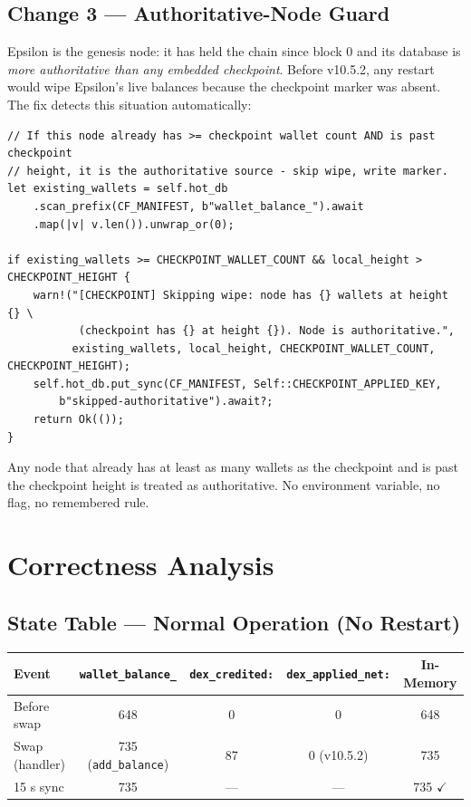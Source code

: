 \documentclass[11pt,a4paper]{article}
\begin{document}
\subsection{Change 3 — Authoritative-Node Guard}

Epsilon is the genesis node: it has held the chain since block 0 and its
database is \emph{more authoritative than any embedded checkpoint}.  Before
v10.5.2, any restart would wipe Epsilon's live balances because the checkpoint
marker was absent.  The fix detects this situation automatically:

\begin{lstlisting}[caption={Authoritative-node guard — \texttt{lib.rs} checkpoint entry point},
                   label={lst:guard}]
// If this node already has >= checkpoint wallet count AND is past checkpoint
// height, it is the authoritative source - skip wipe, write marker.
let existing_wallets = self.hot_db
    .scan_prefix(CF_MANIFEST, b"wallet_balance_").await
    .map(|v| v.len()).unwrap_or(0);

if existing_wallets >= CHECKPOINT_WALLET_COUNT && local_height > CHECKPOINT_HEIGHT {
    warn!("[CHECKPOINT] Skipping wipe: node has {} wallets at height {} \
           (checkpoint has {} at height {}). Node is authoritative.",
          existing_wallets, local_height, CHECKPOINT_WALLET_COUNT, CHECKPOINT_HEIGHT);
    self.hot_db.put_sync(CF_MANIFEST, Self::CHECKPOINT_APPLIED_KEY,
        b"skipped-authoritative").await?;
    return Ok(());
}
\end{lstlisting}

Any node that already has at least as many wallets as the checkpoint and is
past the checkpoint height is treated as authoritative.  No environment
variable, no flag, no remembered rule.

\section{Correctness Analysis}

\subsection{State Table — Normal Operation (No Restart)}

\begin{center}
\begin{tabular}{lcccc}
\toprule
\textbf{Event} & \textbf{\texttt{wallet\_balance\_}} & \textbf{\texttt{dex\_credited:}} &
  \textbf{\texttt{dex\_applied\_net:}} & \textbf{In-Memory} \\
\midrule
Before swap & 648 & 0 & 0 & 648 \\
Swap (handler) & 735 (\texttt{add\_balance}) & 87 & 0 (v10.5.2) & 735 \\
15 s sync & 735 & --- & --- & 735 $\checkmark$ \\
\bottomrule
\end{tabular}
\end{center}
\end{document}
